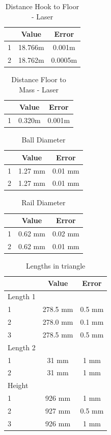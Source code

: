 \documentclass[a4paper,%
               aps,%
               prl,%
               amsfonts,%
               amssymb,%
               amsmath,%
               nobibnotes,%
               twocolumn, %
               twoside,%
               balancelastpage,%
               eqsecnum] %
               {revtex4-1}
\begin{document}
\begin{table}[H]
\centering
\begin{tabular}[t]{lcc}
\hline
&Value &Error\\
\hline
1&18.766m&0.001m\\
2&18.762m&0.0005m\\
\hline
\end{tabular}
\caption{Distance Hook to Floor - Laser}
\end{table}

\begin{table}[H]
\centering
\begin{tabular}[t]{lcc}
\hline
&Value &Error\\
\hline
1&0.320m&0.001m\\
\hline
\end{tabular}
\caption{Distance Floor to Mass - Laser}
\end{table}

\begin{table}[H]
    \centering
    \begin{tabular}{lcc}
    \hline
    &Value &Error\\
    \hline
     1 & 1.27 mm & 0.01 mm \\
     2 & 1.27 mm &  0.01 mm\\
    \hline
    \end{tabular}
    \caption{Ball Diameter}
    \label{tab:ball}
\end{table}

\begin{table}[H]
    \centering
    \begin{tabular}{lcc}
    \hline
    &Value &Error\\
    \hline
     1 & 0.62 mm & 0.02 mm \\
     2 & 0.62 mm & 0.01 mm \\
    \hline
    \end{tabular}
    \caption{Rail Diameter}
    \label{tab:rail}
\end{table}

\begin{table}[H]
    \centering
    \begin{tabular}{lcc}
    \hline
    &Value &Error\\
    \hline
    \hline
    Length 1&&\\
    \hline
     1 & 278.5 mm & 0.5 mm \\
     2 & 278.0 mm & 0.1 mm \\
     3 & 278.5 mm & 0.5 mm \\
    \hline
    \hline
    Length 2&&\\
    \hline
    1 & 31 mm & 1 mm \\
    2 & 31 mm & 1 mm \\
    \hline
    \hline
    Height &&\\
    \hline
    1 & 926 mm & 1 mm \\
    2 & 927 mm & 0.5 mm \\
    3 & 926 mm & 1 mm \\
    \hline
    \end{tabular}
    \caption{Lengths in triangle}
    \label{tab:my_label}
\end{table}
\end{document}
